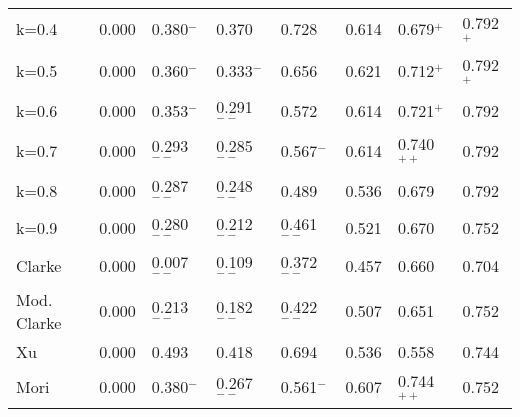 \begin{table}[t]
\begin{center}
\begin{tabular}{|l@{ }|l@{ }|l@{ }|l@{ }|l@{ }|l@{ }|l@{ }|l@{ }|}
k=0.4            & 0.000        & 0.380$^{-}$  & 0.370        & 0.728        & 0.614        & 0.679$^{+}$  & 0.792$^{+}$\\
k=0.5            & 0.000        & 0.360$^{-}$  & 0.333$^{-}$  & 0.656        & 0.621        & 0.712$^{+}$  & 0.792$^{+}$\\
k=0.6            & 0.000        & 0.353$^{-}$  & 0.291$^{--}$ & 0.572        & 0.614        & 0.721$^{+}$  & 0.792\\
k=0.7            & 0.000        & 0.293$^{--}$ & 0.285$^{--}$ & 0.567$^{-}$  & 0.614        & 0.740$^{++}$ & 0.792\\
k=0.8            & 0.000        & 0.287$^{--}$ & 0.248$^{--}$ & 0.489        & 0.536        & 0.679        & 0.792\\
k=0.9            & 0.000        & 0.280$^{--}$ & 0.212$^{--}$ & 0.461$^{--}$ & 0.521        & 0.670        & 0.752\\\hline
Clarke           & 0.000        & 0.007$^{--}$ & 0.109$^{--}$ & 0.372$^{--}$ & 0.457        & 0.660        & 0.704\\\hline
Mod. Clarke      & 0.000        & 0.213$^{--}$ & 0.182$^{--}$ & 0.422$^{--}$ & 0.507        & 0.651        & 0.752\\\hline
Xu               & 0.000        & 0.493        & 0.418        & 0.694        & 0.536        & 0.558        & 0.744\\\hline
Mori             & 0.000        & 0.380$^{-}$  & 0.267$^{--}$ & 0.561$^{-}$  & 0.607        & 0.744$^{++}$ & 0.752\\\hline
\end{tabular}
\label{tab:task-1-docnum}
\end{center}
\end{table}

